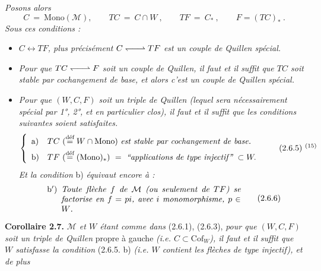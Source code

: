 \documentclass[11pt]{article}
\newcommand{\msp}[1]{\marginpar{\footnotesize [#1]}}
\newcommand{\deq}{\overset{\text{déf}}{=}}
\newcommand{\Mono}{\mathrm{Mono}}
\newcommand{\Cof}{\mathrm{Cof}}
\newcommand{\qpair}{\mathrel{\leftharpoondown\joinrel\relbar\joinrel\rightharpoonup}}
\begin{document}
\msp{page 26}
\textit{Posons alors}
\[ C \ = \ \Mono(\mathcal{M}), \qquad TC \ = \ C\cap W\ , \qquad TF \ = \ C_*\ , \qquad F = (TC)_*\ . \tag*{(2.6.4)} \]
\textit{Sous ces conditions :}
\begin{itemize}[leftmargin=2.5em]
\item[1°)] \textit{$C \longleftrightarrow TF$, plus précisément $C \qpair TF$ est un couple de Quillen spécial.} %
\item[2°)] \textit{Pour que $TC \qpair F$ soit un couple de Quillen, il faut et il suffit que $TC$ soit stable par cochangement de base, et alors c'est un couple de Quillen spécial.} %
\item[3°)] \textit{Pour que $(W,C,F)$ soit un triple de Quillen (lequel sera nécessairement spécial par \textup{1°, 2°}, et en particulier clos), il faut et il suffit que les conditions suivantes soient satisfaites.}
\[ \left\{ \begin{array}{ll}
\text{a)} & TC\ (\deq W\cap\Mono)\ \text{\itshape est stable par cochangement de base.}\\[1ex]
\text{b)} & TF\ (\deq (\Mono)_*) \ = \ \text{\itshape “applications de type injectif”}\ \subset W.
\end{array}\right. \tag*{(2.6.5)~$^{(15)}$} \]
\textit{Et la condition} b) \textit{équivaut encore à :}
\[ \begin{minipage}{0.7\textwidth}
\begin{itemize}[leftmargin=2.5em]
\item[b$'$)] \textit{Toute flèche $f$ de $\mathcal{M}$ (ou seulement de $TF$) se factorise en $f = pi$, avec $i$ monomorphisme, $p \in W$.}
\end{itemize}
\end{minipage} \tag*{(2.6.6)} \]
\end{itemize}

\textbf{Corollaire 2.7.} \textit{$\mathcal{M}$ et $W$ étant comme dans} (2.6.1), (2.6.3), \textit{pour que $(W,C,F)$ soit un triple de Quillen} propre à gauche \textit{(i.e. $C \subset \Cof_W$), il faut et il suffit que $W$ satisfasse la condition} (2.6.5. b) \textit{(i.e. $W$ contient les flèches de type injectif), et de plus}
\msp{page 27}
\end{document}
